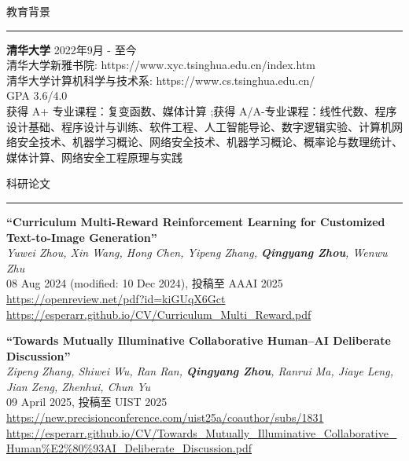 \documentclass{resume} %
\renewenvironment{rSection}[1]{
\sectionskip
\textcolor{TsinghuaPurple}{\MakeUppercase{#1}}
\sectionlineskip
\hrule
\begin{list}{}{
\setlength{\leftmargin}{0em}
}
\item[]
}{
\end{list}
}
\begin{document}
  


\begin{rSection}{教育背景}

{\bf 清华大学} \hfill
{2022年9月 - 至今}\\ 
清华大学新雅书院: https://www.xyc.tsinghua.edu.cn/index.htm
\\
清华大学计算机科学与技术系: https://www.cs.tsinghua.edu.cn/
\\
GPA 3.6/4.0
\\
获得 A+ 专业课程：复变函数、媒体计算 ;获得 A/A-专业课程：线性代数、程序设计基础、程序设计与训练、软件工程、人工智能导论、数字逻辑实验、计算机网络安全技术、机器学习概论、网络安全技术、机器学习概论、概率论与数理统计、媒体计算、网络安全工程原理与实践\\


\end{rSection} 

\begin{rSection}{科研论文}
\item
\textbf{``Curriculum Multi-Reward Reinforcement Learning for Customized Text-to-Image Generation''}\\
\textit{Yuwei Zhou, Xin Wang, Hong Chen, Yipeng Zhang, \textbf{Qingyang Zhou}, Wenwu Zhu}\\
08 Aug 2024 (modified: 10 Dec 2024), 投稿至 AAAI 2025\\
\url{https://openreview.net/pdf?id=kiGUqX6Gct}\\
\url{https://esperarr.github.io/CV/Curriculum_Multi_Reward.pdf}

\item
\textbf{``Towards Mutually Illuminative Collaborative Human--AI Deliberate Discussion''}\\
\textit{Zipeng Zhang, Shiwei Wu, Ran Ran, \textbf{Qingyang Zhou}, Ranrui Ma, Jiaye Leng, Jian Zeng, Zhenhui, Chun Yu}\\
09 April 2025, 投稿至 UIST 2025\\
\url{https://new.precisionconference.com/uist25a/coauthor/subs/1831}\\
\url{https://esperarr.github.io/CV/Towards_Mutually_Illuminative_Collaborative_Human%E2%80%93AI_Deliberate_Discussion.pdf}
\end{rSection}
\end{document}
